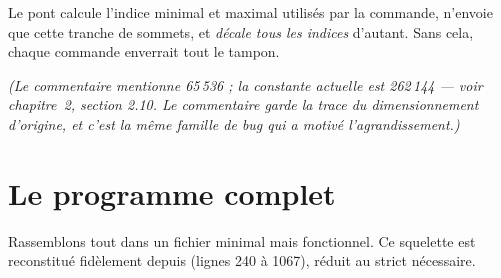 Le pont calcule l'indice minimal et maximal utilisés par la commande, n'envoie
que cette tranche de sommets, et \emph{décale tous les indices} d'autant. Sans
cela, chaque commande enverrait tout le tampon.

\emph{(Le commentaire mentionne 65\,536 ; la constante actuelle est
262\,144 — voir chapitre~2, section 2.10. Le commentaire garde la trace du
dimensionnement d'origine, et c'est la même famille de bug qui a motivé
l'agrandissement.)}

\section{Le programme complet}

Rassemblons tout dans un fichier minimal mais fonctionnel. Ce squelette est
reconstitué fidèlement depuis 
(lignes 240 à 1067), réduit au strict nécessaire.

